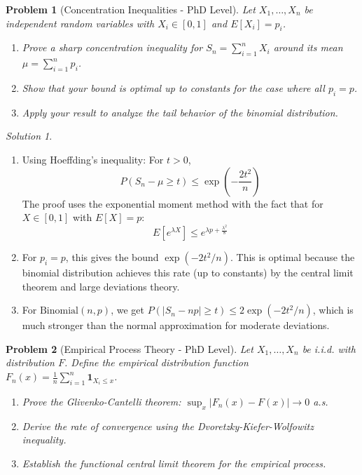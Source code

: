 \documentclass[12pt,a4paper]{article}
\newtheorem{problem}{Problem}[section]
\theoremstyle{remark}
\newtheorem{solution}{Solution}[section]
\begin{document}
\begin{problem}[Concentration Inequalities - PhD Level]
Let $X_1, \ldots, X_n$ be independent random variables with $X_i \in [0,1]$ and $E[X_i] = p_i$.
\begin{enumerate}[label=(\alph*)]
\item Prove a sharp concentration inequality for $S_n = \sum_{i=1}^n X_i$ around its mean $\mu = \sum_{i=1}^n p_i$.
\item Show that your bound is optimal up to constants for the case where all $p_i = p$.
\item Apply your result to analyze the tail behavior of the binomial distribution.
\end{enumerate}
\end{problem}

\begin{solution}
\begin{enumerate}[label=(\alph*)]
\item Using Hoeffding's inequality: For $t > 0$,
$$P(S_n - \mu \geq t) \leq \exp\left(-\frac{2t^2}{n}\right)$$
The proof uses the exponential moment method with the fact that for $X \in [0,1]$ with $E[X] = p$:
$$E[e^{\lambda X}] \leq e^{\lambda p + \frac{\lambda^2}{8}}$$

\item For $p_i = p$, this gives the bound $\exp(-2t^2/n)$. This is optimal because the binomial distribution achieves this rate (up to constants) by the central limit theorem and large deviations theory.

\item For $\text{Binomial}(n,p)$, we get $P(|S_n - np| \geq t) \leq 2\exp(-2t^2/n)$, which is much stronger than the normal approximation for moderate deviations.
\end{enumerate}
\end{solution}

\begin{problem}[Empirical Process Theory - PhD Level]
Let $X_1, \ldots, X_n$ be i.i.d. with distribution $F$. Define the empirical distribution function $F_n(x) = \frac{1}{n}\sum_{i=1}^n \mathbf{1}_{X_i \leq x}$.
\begin{enumerate}[label=(\alph*)]
\item Prove the Glivenko-Cantelli theorem: $\sup_x |F_n(x) - F(x)| \to 0$ a.s.
\item Derive the rate of convergence using the Dvoretzky-Kiefer-Wolfowitz inequality.
\item Establish the functional central limit theorem for the empirical process.
\end{enumerate}
\end{problem}
\end{document}
